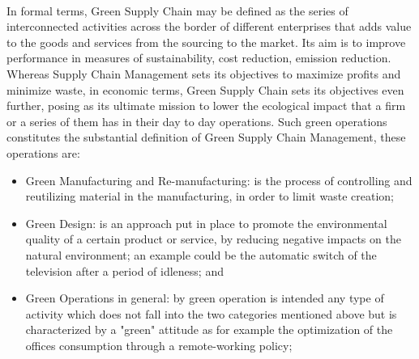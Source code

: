 \documentclass{article}
\begin{document}
\\
In formal terms, Green Supply Chain may be defined as the series of interconnected activities across the border of different enterprises that adds value to the goods and services from the sourcing to the market. Its aim is to improve performance in measures of sustainability, cost reduction, emission reduction. Whereas Supply Chain Management sets its objectives to maximize profits and minimize waste, in economic terms, Green Supply Chain sets its objectives even further, posing as its ultimate mission to lower the ecological impact that a firm or a series of them has in their day to day operations. 
Such green operations\cite{srivastava_green_2007}\cite{Zhu2008} constitutes the substantial definition of Green Supply Chain Management, these operations are:
  \begin{itemize}
    \item Green Manufacturing and Re-manufacturing: is the process of controlling and reutilizing material in the manufacturing, in order to limit waste creation\cite{urvashi_green_2013};
    \item Green Design: is an approach put in place to promote the environmental quality of a certain product or service,  by reducing negative impacts on the natural environment; an example could be the automatic switch of the television after a period of idleness\cite{ceschin_evolution_2016}; and
    \item Green Operations in general: by green operation is intended any type of activity which does not fall into the two categories mentioned above but is characterized by a "green" attitude as for example the optimization of the offices consumption through a remote-working policy;
  \end{itemize}
  
\end{document}
